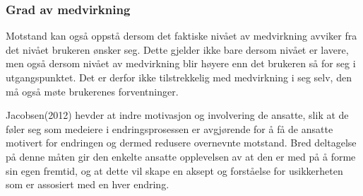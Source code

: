 \subsubsection{Grad av medvirkning}
Motstand kan også oppstå dersom det faktiske nivået av medvirkning avviker fra det nivået brukeren ønsker seg. Dette gjelder ikke bare dersom nivået er lavere, men også dersom nivået av medvirkning blir høyere enn det brukeren så for seg i utgangspunktet. Det er derfor ikke tilstrekkelig med medvirkning i seg selv, den må også møte brukerenes forventninger. \cite{Cavaye95}

\noindent
Jacobsen(2012) hevder at indre motivasjon og involvering de ansatte, slik at de føler seg som medeiere i endringsprosessen er avgjørende for å få de ansatte motivert for endringen og dermed redusere overnevnte motstand. Bred deltagelse på denne måten gir den enkelte ansatte opplevelsen av at den er med på å forme sin egen fremtid, og at dette vil skape en aksept og forståelse for usikkerheten som er assosiert med en hver endring.